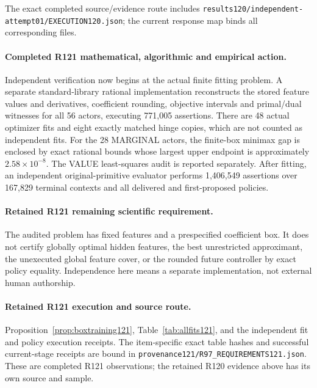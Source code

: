 The exact completed source/evidence route includes \nolinkurl{results120/independent-attempt01/EXECUTION120.json}; the current response map binds all corresponding files.

\paragraph{Completed R121 mathematical, algorithmic and empirical action.}
Independent verification now begins at the actual finite fitting problem. A separate standard-library rational implementation reconstructs the stored feature values and derivatives, coefficient rounding, objective intervals and primal/dual witnesses for all 56 actors, executing 771,005 assertions. There are 48 actual optimizer fits and eight exactly matched hinge copies, which are not counted as independent fits. For the 28 MARGINAL actors, the finite-box minimax gap is enclosed by exact rational bounds whose largest upper endpoint is approximately $2.58\times10^{-8}$. The VALUE least-squares audit is reported separately. After fitting, an independent original-primitive evaluator performs 1,406,549 assertions over 167,829 terminal contexts and all delivered and first-proposed policies.

\paragraph{Retained R121 remaining scientific requirement.}
The audited problem has fixed features and a prespecified coefficient box. It does not certify globally optimal hidden features, the best unrestricted approximant, the unexecuted global feature cover, or the rounded future controller by exact policy equality. Independence here means a separate implementation, not external human authorship.

\paragraph{Retained R121 execution and source route.}
Proposition~\ref{prop:boxtraining121}, Table~\ref{tab:allfits121}, and the independent fit and policy execution receipts.
The item-specific exact table hashes and successful current-stage receipts are bound in \nolinkurl{provenance121/R97_REQUIREMENTS121.json}. These are completed R121 observations; the retained R120 evidence above has its own source and sample.
